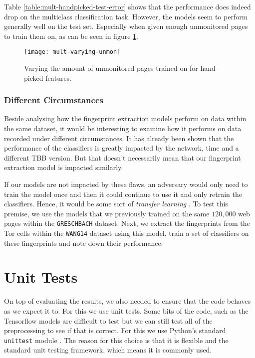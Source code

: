 Table \ref{table:mult-handpicked-test-error} shows that the performance does indeed drop on the multiclass classification task.
However, the models seem to perform generally well on the test set.
Especially when given enough unmonitored pages to train them on, as can be seen in figure \ref{fig:mult-varying-unmon}.

\begin{figure}[ht]
  \centering
  \texttt{[image: mult-varying-unmon]}
  \caption{Varying the amount of unmonitored pages trained on for hand-picked features.}
  \label{fig:mult-varying-unmon}
\end{figure}


\subsubsection{Different Circumstances}

Beside analysing how the fingerprint extraction models perform on data within the same dataset, it would be interesting to examine how it performs on data recorded under different circumstances.
It has already been shown that the performance of the classifiers is greatly impacted by the network, time and a different TBB version.
But that doesn't necessarily mean that our fingerprint extraction model is impacted similarly.

If our models are not impacted by these flaws, an adversary would only need to train the model once and then it could continue to use it and only retrain the classifiers.
Hence, it would be some sort of \textit{transfer learning}
.
To test this premise, we use the models that we previously trained on the same $120,000$ web pages within the \texttt{GRESCHBACH} dataset.
Next, we extract the fingerprints from the Tor cells within the \texttt{WANG14} dataset using this model, train a set of classifiers on these fingerprints and note down their performance.



\section{Unit Tests}

On top of evaluating the results, we also needed to ensure that the code behaves as we expect it to.
For this we use unit tests.
Some bits of the code, such as the Tensorflow models are difficult to test but we can still test all of the preprocessing to see if that is correct.
For this we use Python's standard \texttt{unittest} module \cite{python_unittest_documentation}.
The reason for this choice is that it is flexible and the standard unit testing framework, which means it is commonly used.

